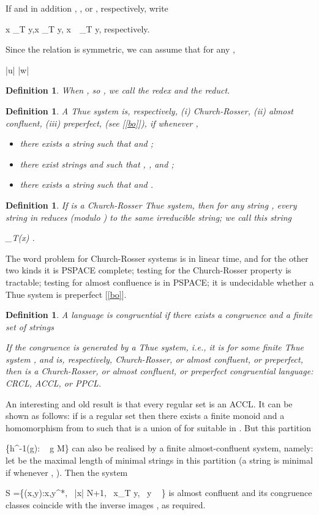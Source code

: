 \documentclass[12pt,a4paper]{article}
\newtheorem{definition}[theorem]{Definition}
\newcommand{\thuecong}{{\overset{*}{\leftrightarrow}}}
\newcommand{\irr}{{\text{\rm irr}}}
\newcommand{\pres}{\,
{\vrule height5pt width.5pt depth0pt
\overset{\vrule height.5pt width10pt depth0pt}
{\vrule height0pt width0pt depth0pt}
\vrule height5pt width.5pt depth0pt}\,}
\numberwithin{equation}{section}
\newcommand{\be}{}
\begin{document}
\noindent
If  and in addition , , or
, respectively, write
\be
x \to_T y,\quad{}\quad x \mapsto_T y,
\quad{}\quad x {\pres}_T y,
\ee
respectively.

Since the relation  is
symmetric, we can assume that for any
,
\be
|u| \geq |w|
\ee

\begin{definition}
\label{def: redex}
When , so
, we call  the {\em redex} and  the {\em reduct}.
\end{definition}


\begin{definition}
A Thue system  is, respectively, {\rm (i)} Church-Rosser,
{\rm (ii)} almost confluent, {\rm (iii)} preperfect,
(see {\rm [\ref{bo}]}), if whenever ,

\begin{itemize}
\item [{\rm (i)}] 
there exists a string  such that  and
;
\item [{\rm (ii)}] there exist strings  and  such that
,
,
and ;
\item [{\rm (iii)}]
there exists a string  such that
 and .
\end{itemize}
\end{definition}

\begin{definition}
\label{def: irr}
If  is a Church-Rosser Thue system, then for any string
, every string  in  reduces (modulo ) to
the same irreducible string; we call this string
\be
\irr_T(x) .
\ee
\end{definition}

The word problem for Church-Rosser systems is in linear
time, and for the other two kinds it is PSPACE complete;
testing for the Church-Rosser property is tractable;
testing for almost confluence is in PSPACE;
it is undecidable whether a Thue system is preperfect [\ref{bo}].

\begin{definition}
\label{def: congruential language}
A language  is {\em congruential} if there exists
a congruence  and a finite set of strings


If the congruence is generated by a Thue system,
i.e., it is  for some finite Thue system ,
and  is, respectively, Church-Rosser, or almost confluent,
or preperfect, then  is a Church-Rosser, or almost confluent,
or preperfect congruential language: {\em CRCL, ACCL}, or {\em PPCL}.
\end{definition}

An interesting and  old result is that every regular set is
an ACCL.  It can be shown as follows:
if  is a regular set then there exists
a finite monoid  and a homomorphism from
 to  such that  is a union
of  for suitable  in .
But this partition 
\be
\{h^{-1}(g): ~ g \in M\}
\ee
can also be realised by a finite almost-confluent
system, namely: let  be the maximal length of minimal
strings in this partition (a  string is minimal
if whenever , ).
Then the system
\be
S =\{(x,y):\quad x,y\in \Sigma^*,~
|x| \leq N+1,~ x{\thuecong}_T y,~ y ~  \}
\ee
is almost confluent and its congruence classes
coincide with the inverse images , as required.
\end{document}
